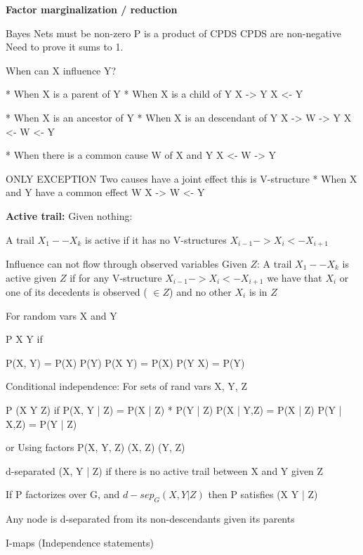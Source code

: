 \documentclass[10pt,twocolumn,letterpaper]{article}
\begin{document}
\textbf{Factor marginalization / reduction}


Bayes Nets must be non-zero
P is a product of CPDS CPDS are non-negative
Need to prove it sums to 1.


When can X influence Y?

 * When X is a parent of Y
 * When X is a child of Y
 X -> Y
 X <- Y

 * When X is an ancestor of Y
 * When X is an descendant of Y
 X -> W -> Y
 X <- W <- Y

 * When there is a common cause W of X and Y
 X <- W -> Y

 ONLY EXCEPTION
 Two causes have a joint effect
 this is V-structure
 * When X and Y have a common effect W
 X -> W <- Y


\textbf{Active trail:}
Given nothing:

    A trail $X_1 -- X_k$ is active if it has no V-structures
    $X_{i-1} -> X_i <- X_{i+1}$

Influence can not flow through observed variables
Given $Z$:
     A trail $X_1 -- X_k$ is active given $Z$ if 
     for any V-structure 
     $X_{i-1} -> X_i <- X_{i+1}$
     we have that $X_i$ or one of its decedents is observed (\ie{} $\in Z$)
     and no other $X_i$ is in $Z$



 For random vars X and Y

 P \models X \perp Y if 

 P(X, Y) = P(X) P(Y)
 P(X \given Y) = P(X) 
 P(Y \given X) = P(Y) 


 Conditional independence:
 For sets of rand vars X, Y, Z

 P \models (X \perp Y \given Z) if 
 P(X, Y | Z) = P(X | Z) * P(Y | Z)
 P(X | Y,Z) = P(X | Z)
 P(Y | X,Z) = P(Y | Z)

 or Using factors
 P(X, Y, Z) \prop {}(X, Z) (Y, Z)


 d-separated (X, Y | Z) if there is no active trail between X and Y given Z


 If P factorizes over G, and $d-sep_G(X, Y | Z)$ then 
 P satisfies (X \perp Y | Z) 


 Any node is d-separated from its non-descendants given its parents


 I-maps (Independence statements)
\end{document}
